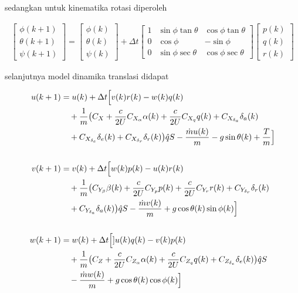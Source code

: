 sedangkan untuk kinematika rotasi diperoleh

\begin{align}
    \begin{bmatrix}
        \phi(k+1) \\
        \theta(k+1) \\
        \psi(k+1)
    \end{bmatrix} = \begin{bmatrix}
        \phi(k) \\
        \theta(k) \\
        \psi(k)
    \end{bmatrix} + \Delta t \begin{bmatrix}
        1 & \sin\phi\tan\theta & \cos\phi\tan\theta \\
        0 & \cos\phi & -\sin\phi \\
        0 & \sin\phi\sec\theta & \cos\phi\sec\theta
    \end{bmatrix} \begin{bmatrix}
        p(k) \\ q(k) \\ r(k)
    \end{bmatrix}
\end{align}

selanjutnya model dinamika translasi didapat

\begin{align}
    u(k+1) &= u(k) + \Delta t \Bigl[v(k)r(k)-w(k)q(k) \notag \\ 
    &\quad +\frac{1}{m}\bigl(C_X+\frac{c}{2U}C_{X_{\alpha}}\alpha(k)+\frac{c}{2U}C_{X_{q}}q(k)+C_{X_{\delta_a}}\delta_a(k) \notag \\
    &\quad +C_{X_{\delta_e}}\delta_e(k)+C_{X_{\delta_r}}\delta_r(k) \bigr)\hat{q}S -\frac{\Dot{m}u(k)}{m}-g\sin\theta(k)+\frac{T}{m} \Bigr] \\ 
    \notag \\
    v(k+1) &= v(k) + \Delta t \Bigl[ w(k)p(k)-u(k)r(k) \notag \\ 
    &\quad +\frac{1}{m}\bigl(C_{Y_{\beta}}\beta(k) + \frac{c}{2U}C_{Y_p}p(k)+\frac{c}{2U}C_{Y_r}r(k)+C_{Y_{\delta_r}}\delta_r(k) \notag \\ 
    &\quad +C_{Y_{\delta_a}}\delta_a(k)\bigr)\hat{q}S-\frac{\Dot{m}v(k)}{m}+g\cos\theta(k)\sin\phi(k) \Bigr] \\ 
    \notag \\
    w(k+1) &= w(k) + \Delta t \Bigl[] u(k)q(k)-v(k)p(k) \notag \\
    &\quad +\frac{1}{m}\bigl(C_Z+\frac{c}{2U}C_{Z_{\alpha}}\alpha(k)+\frac{c}{2U}C_{Z_q}q(k)+C_{Z_{\delta_e}}\delta_e(k)\bigr)\hat{q}S \notag \\
    &\quad -\frac{\Dot{m}w(k)}{m}+g\cos\theta(k)\cos\phi(k) \Bigr]
\end{align}

